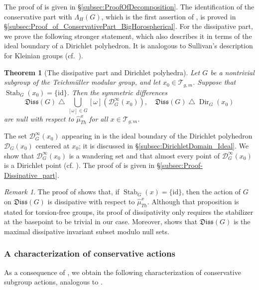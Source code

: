 \documentclass[dvipdfmx]{amsart}
\newtheorem{theorem}{Theorem}[section]
\theoremstyle{remark}
\newtheorem{remark}{Remark}[section]
\newcommand{\teich}{\mathcal{T}}
\newcommand{\PThursM}{\hat{\mu}_{Th}}
\newcommand{\Dirichlet}{\mathscr{D}}
\newcommand{\dissipativepart}{\mathfrak{Diss}}
\begin{document}
The proof of  is given in
\S\ref{subsec:ProofOfDecomposition}.
The identification of the conservative part with $\Lambda_H(G)$,
which is the first assertion of ,
is proved in \S\ref{subsec:Proof_of_ConservativePart_BigHorospherical}.
For the dissipative part, we prove the following stronger statement,
which also describes it in terms of the ideal boundary of a Dirichlet
polyhedron. It is analogous to Sullivan's description for Kleinian
groups (cf.\ \cite[Corollary in Section IV]{Sullivan1981}).

\begin{theorem}[The dissipative part and Dirichlet polyhedra]
\label{thm:Dissipative_part}
Let $G$ be a nontrivial subgroup of the Teichm\"uller modular group, and let $x_0\in\teich_{g,m}$. Suppose that $\operatorname{Stab}_G(x_0)=\{\mathrm{id}\}$. Then the symmetric differences
\[
\dissipativepart(G)\bigtriangleup \bigcup_{[\omega]\in G}[\omega](\Dirichlet^\infty_G(x_0)),\quad
\dissipativepart(G)\bigtriangleup \operatorname{Dir}_G(x_0)
\]
are null with respect to $\PThursM^{x}$ for all $x\in \teich_{g,m}$.
\end{theorem}

The set $\Dirichlet^\infty_G(x_0)$ appearing in  is the ideal boundary of the Dirichlet polyhedron $\Dirichlet_G(x_0)$ centered at $x_0$; it is discussed in \S\ref{subsec:DirichletDomain_Ideal}. We show that $\Dirichlet^\infty_G(x_0)$ is a wandering set and that almost every point of $\Dirichlet^\infty_G(x_0)$ is a Dirichlet point (cf. ).
The proof of  is given in \S\ref{subsec:Proof-Dissipative_part}.

\begin{remark}
The proof of \cite[Proposition D11.5]{HubbardVol3_2022} shows that, if $\operatorname{Stab}_G(x)=\{\mathrm{id}\}$, then the action of $G$ on $\dissipativepart(G)$ is dissipative with respect to $\PThursM^x$. Although that proposition is stated for torsion-free groups, its proof of dissipativity only requires the stabilizer at the basepoint to be trivial in our case. Moreover,  shows that $\dissipativepart(G)$ is the maximal dissipative invariant subset modulo null sets.
\end{remark}

\subsubsection{A characterization of conservative actions}
As a consequence of , we obtain the following characterization of conservative subgroup actions, analogous to \cite[Corollary in Section IV]{Sullivan1981}.
\end{document}
